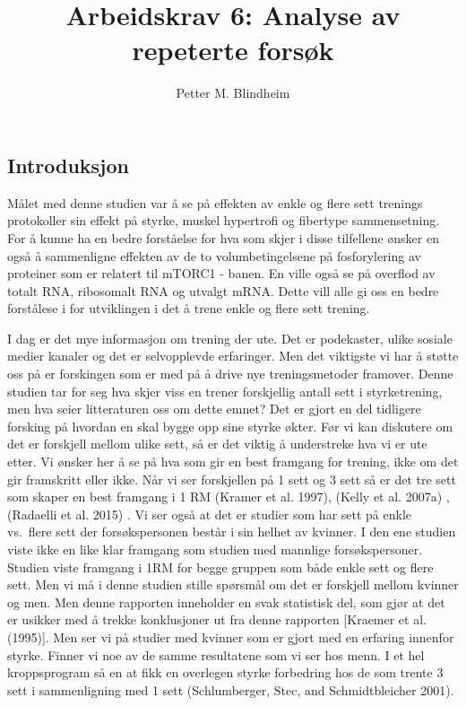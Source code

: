 \documentclass[
  letterpaper,
  DIV=11,
  numbers=noendperiod]{scrartcl}
\title{Arbeidskrav 6: Analyse av repeterte forsøk}
\author{Petter M. Blindheim}
\date{}
\begin{document}
\maketitle
\ifdefined\Shaded\renewenvironment{Shaded}{\begin{tcolorbox}[sharp corners, boxrule=0pt, breakable, interior hidden, borderline west={3pt}{0pt}{shadecolor}, frame hidden, enhanced]}{\end{tcolorbox}}\fi

\hypertarget{introduksjon}{%
\subsection{Introduksjon}\label{introduksjon}}

Målet med denne studien var å se på effekten av enkle og flere sett
trenings protokoller sin effekt på styrke, muskel hypertrofi og
fibertype sammensetning. For å kunne ha en bedre forståelse for hva som
skjer i disse tilfellene ønsker en også å sammenligne effekten av de to
volumbetingelsene på fosforylering av proteiner som er relatert til
mTORC1 - banen. En ville også se på overflod av totalt RNA, ribosomalt
RNA og utvalgt mRNA. Dette vill alle gi oss en bedre forstålese i for
utviklingen i det å trene enkle og flere sett trening.

I dag er det mye informasjon om trening der ute. Det er podekaster,
ulike sosiale medier kanaler og det er selvopplevde erfaringer. Men det
viktigste vi har å støtte oss på er forskingen som er med på å drive nye
treningsmetoder framover. Denne studien tar for seg hva skjer viss en
trener forskjellig antall sett i styrketrening, men hva seier
litteraturen oss om dette emnet? Det er gjort en del tidligere forsking
på hvordan en skal bygge opp sine styrke økter. Før vi kan diskutere om
det er forskjell mellom ulike sett, så er det viktig å understreke hva
vi er ute etter. Vi ønsker her å se på hva som gir en best framgang for
trening, ikke om det gir framskritt eller ikke. Når vi ser forskjellen
på 1 sett og 3 sett så er det tre sett som skaper en best framgang i 1
RM (Kramer et al. 1997), (Kelly et al. 2007a) , (Radaelli et al. 2015) .
Vi ser også at det er studier som har sett på enkle vs.~flere sett der
forsøkspersonen består i sin helhet av kvinner. I den ene studien viste
ikke en like klar framgang som studien med mannlige forsøkspersoner.
Studien viste framgang i 1RM for begge gruppen som både enkle sett og
flere sett. Men vi må i denne studien stille spørsmål om det er
forskjell mellom kvinner og men. Men denne rapporten inneholder en svak
statistisk del, som gjør at det er usikker med å trekke konklusjoner ut
fra denne rapporten {[}Kraemer et al. (1995){]}. Men ser vi på studier
med kvinner som er gjort med en erfaring innenfor styrke. Finner vi noe
av de samme resultatene som vi ser hos menn. I et hel kroppsprogram så
en at fikk en overlegen styrke forbedring hos de som trente 3 sett i
sammenligning med 1 sett (Schlumberger, Stec, and Schmidtbleicher 2001).
\end{document}
